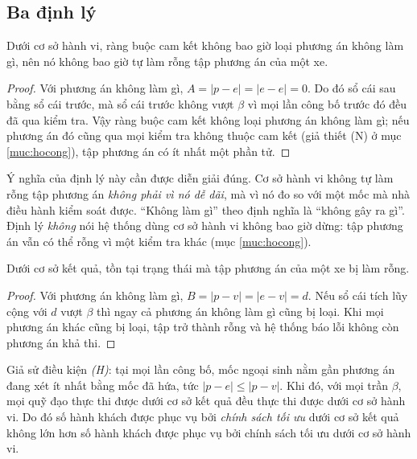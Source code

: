 \subsection{Ba định lý}
\label{muc:badinhly}

\begin{dinhly}
\label{dl:hanhvi}
Dưới cơ sở hành vi, ràng buộc cam kết không bao giờ loại phương án không làm gì, nên nó không bao
giờ tự làm rỗng tập phương án của một xe.
\end{dinhly}

\begin{proof}
Với phương án không làm gì, $A = |p - e| = |e - e| = 0$. Do đó sổ cái sau bằng sổ cái trước,
mà sổ cái trước không vượt $\beta$ vì mọi lần công bố trước đó đều đã qua kiểm tra. Vậy ràng buộc
cam kết không loại phương án không làm gì; nếu phương án đó cũng qua mọi kiểm tra không thuộc cam
kết (giả thiết (N) ở mục \ref{muc:hocong}), tập phương án có ít nhất một phần tử.
\end{proof}

Ý nghĩa của định lý này cần được diễn giải đúng. Cơ sở hành vi không tự làm rỗng tập phương án
\emph{không phải vì nó dễ dãi}, mà vì nó đo so với một mốc mà nhà điều hành kiểm soát được. ``Không
làm gì'' theo định nghĩa là ``không gây ra gì''. Định lý \emph{không} nói hệ thống dùng cơ sở hành
vi không bao giờ dừng: tập phương án vẫn có thể rỗng vì một kiểm tra khác (mục \ref{muc:hocong}).

\begin{dinhly}
\label{dl:ketqua}
Dưới cơ sở kết quả, tồn tại trạng thái mà tập phương án của một xe bị làm rỗng.
\end{dinhly}

\begin{proof}
Với phương án không làm gì, $B = |p - v| = |e - v| = d$. Nếu sổ cái tích lũy cộng với $d$ vượt
$\beta$ thì ngay cả phương án không làm gì cũng bị loại. Khi mọi phương án khác cũng bị loại,
tập trở thành rỗng và hệ thống báo lỗi không còn phương án khả thi.
\end{proof}

\begin{dinhly}
\label{dl:tapcon}
Giả sử điều kiện \emph{(H)}: tại mọi lần công bố, mốc ngoại sinh nằm gần phương án đang xét ít
nhất bằng mốc đã hứa, tức $|p - e| \le |p - v|$. Khi đó, với mọi trần $\beta$, mọi quỹ đạo thực
thi được dưới cơ sở kết quả đều thực thi được dưới cơ sở hành vi. Do đó số hành khách được phục
vụ bởi \emph{chính sách tối ưu} dưới cơ sở kết quả không lớn hơn số hành khách được phục vụ bởi
chính sách tối ưu dưới cơ sở hành vi.
\end{dinhly}

